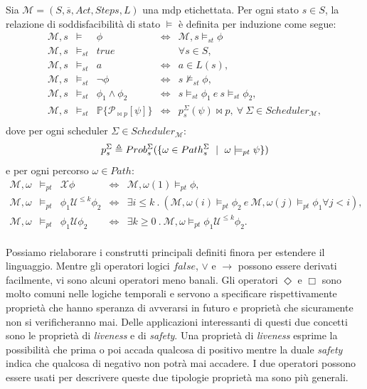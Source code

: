 \begin{mtdef}
	Sia $\mathcal{M} = (S,\overline{s},Act,Steps,L)$ una \ac{mdp} etichettata. Per ogni stato $s \in S$, la relazione di soddisfacibilità di stato $\models$ è definita per induzione come segue:
$$
	\begin{array}{rllcl}
		\mathcal{M},s &\models& \phi &\Leftrightarrow& \mathcal{M},s \models_{st} \phi \\
		\mathcal{M},s &\models_{st}& true && \forall s \in S, \\
		\mathcal{M},s &\models_{st}& \mathit{a} &\Leftrightarrow& \mathit{a} \in L(s), \\
		\mathcal{M},s &\models_{st}& \neg\phi &\Leftrightarrow& s \not\models_{st} \phi, \\
		\mathcal{M},s &\models_{st}& \phi_1 \wedge \phi_2 &\Leftrightarrow& s\models_{st}\phi_1 \ e\ s\models_{st}\phi_2, \\
		\mathcal{M},s &\models_{st}& \mathbb{P}\{ \mathcal{P}_{\bowtie p}[\psi]\} &\Leftrightarrow& p_s^\Sigma(\psi)\bowtie p,\ \forall\ \Sigma \in Scheduler_\mathcal{M}, \\
	\end{array}
$$
dove per ogni scheduler $\Sigma \in Scheduler_\mathcal{M}$:
$$
p_s^\Sigma \triangleq Prob_s^\Sigma(\{\omega \in Path_s^\Sigma \mbox{ }\mid\mbox{ } \omega \models_{pt} \psi\})
$$
e per ogni percorso $\omega \in Path$:
$$
\begin{array}{rclcl}
	\mathcal{M},\omega & \models_{pt} & \mathcal{X}\phi & \Leftrightarrow & \mathcal{M},\omega(1) \models_{pt} \phi, \\
	\mathcal{M},\omega & \models_{pt} & \phi_1 \mathcal{U}^{\leq k} \phi_2 & \Leftrightarrow & \exists i \leq k\ .\ (\mathcal{M},\omega(i) \models_{pt} \phi_2\ e\ \mathcal{M},\omega(j) \models_{pt} \phi_1 \forall j < i), \\
	\mathcal{M},\omega & \models_{pt} & \phi_1 \mathcal{U} \phi_2 & \Leftrightarrow & \exists k \geq 0\ .\ \mathcal{M},\omega \models_{pt} \phi_1 \mathcal{U}^{\leq k} \phi_2. \\
\end{array}
$$
\end{mtdef}
Possiamo rielaborare i construtti principali definiti finora per estendere il linguaggio. Mentre gli operatori logici $false$, $\vee$ e $\rightarrow$ possono essere derivati facilmente, vi sono alcuni operatori meno banali. Gli operatori $\Diamond$ e $\Box$ sono molto comuni nelle logiche temporali e servono a specificare rispettivamente proprietà che hanno speranza di avverarsi in futuro e proprietà che sicuramente non si verificheranno mai. Delle applicazioni interessanti di questi due concetti sono le proprietà di \emph{liveness} e di \emph{safety}. Una proprietà di \emph{liveness} esprime la possibilità che prima o poi accada qualcosa di positivo mentre la duale \emph{safety} indica che qualcosa di negativo non potrà mai accadere. I due operatori possono essere usati per descrivere queste due tipologie proprietà ma sono più generali. 
